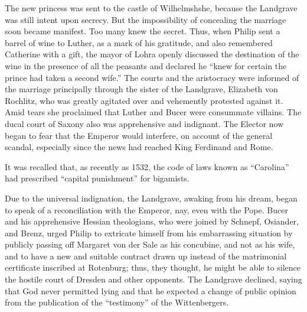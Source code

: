 The new princess was sent to the castle of Wilhelmshshe, because
the Landgrave was still intent upon secrecy. But the impossibility of
concealing the marriage soon became manifest. Too many knew the
secret. Thus, when Philip sent a barrel of wine to Luther, as a mark
of his gratitude, and also remembered Catherine with a gift, the
mayor of Lohra openly discussed the destination of the wine in the
presence of all the peasants and declared he “knew for certain the
prince had taken a second wife.” The courts and the aristocracy were
informed of the marriage principally through the sister of the Landgrave,
Elizabeth von Rochlitz, who was greatly agitated over and
vehemently protested against it. Amid tears she proclaimed that
Luther and Bucer were consummate villains. The ducal court of Saxony also
was apprehensive and indignant. The Elector now began to
fear that the Emperor would interfere, on account of the general scandal,
especially since the news had reached King Ferdinand and Rome.

It was recalled that, as recently as 1532, the code of laws known as
“Carolina” had prescribed “capital punishment” for bigamists.

Due to the universal indignation, the Landgrave, awaking from his
dream, began to speak of a reconciliation with the Emperor, nay,
even with the Pope. Bucer and his apprehensive Hessian theologians,
who were joined by Schnepf, Osiander, and Brenz, urged Philip to extricate
himself from his embarrassing situation by publicly passing off
Margaret von der Sale as his concubine, and not as his wife, and to
have a new and suitable contract drawn up instead of the matrimonial
certificate inscribed at Rotenburg; thus, they thought, he might be
able to silence the hostile court of Dresden and other opponents. The
Landgrave declined, saying that God never permitted lying and that
he expected a change of public opinion from the publication of the
“testimony” of the Wittenbergers.

